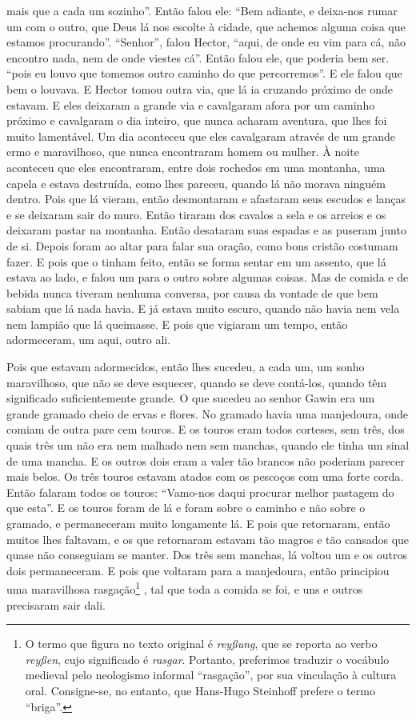 mais que a cada um sozinho”. Então falou ele: “Bem adiante, e deixa-nos rumar
um com o outro, que Deus lá nos escolte à cidade, que achemos alguma coisa que
estamos procurando”. “Senhor”, falou Hector, “aqui, de onde eu vim para cá, não
encontro nada, nem de onde viestes cá”. Então falou ele, que poderia bem ser.
“pois eu louvo que tomemos outro caminho do que percorremos”. E ele falou que
bem o louvava. E Hector tomou outra via, que lá ia cruzando próximo de onde
estavam. E eles deixaram a grande via e cavalgaram afora por um caminho próximo
e cavalgaram o dia inteiro, que nunca acharam aventura, que lhes foi muito
lamentável. Um dia aconteceu que eles cavalgaram através de um grande ermo e
maravilhoso, que nunca encontraram homem ou mulher. À noite aconteceu que eles
encontraram, entre dois rochedos em uma montanha, uma capela e estava
destruída, como lhes pareceu, quando lá não morava ninguém dentro. Pois que lá
vieram, então desmontaram e afastaram seus escudos e lanças e se deixaram sair
do muro. Então tiraram dos cavalos a sela e os arreios e os deixaram pastar na
montanha. Então desataram suas espadas e as puseram junto de si. Depois foram
ao altar para falar sua oração, como bons cristão costumam fazer. E
pois que o tinham feito, então se forma sentar em um assento, que lá estava ao
lado, e falou um para o outro sobre algumas coisas. Mas de comida e de bebida
nunca tiveram nenhuma conversa, por causa da vontade de que bem sabiam que lá
nada havia. E já estava muito escuro, quando não havia nem vela nem lampião que
lá queimasse. E pois que vigiaram um tempo, então adormeceram, um aqui, outro
ali.

Pois que estavam adormecidos, então lhes sucedeu, a cada um, um sonho
maravilhoso, que não se deve esquecer, quando se deve contá-los, quando têm
significado suficientemente grande. O que sucedeu ao senhor Gawin era um grande
gramado cheio de ervas e flores. No gramado havia uma manjedoura, onde comiam
de outra pare cem touros. E os touros eram todos corteses, sem três, dos quais
três um não era nem malhado nem sem manchas, quando ele tinha um sinal de uma
mancha. E os outros dois eram a valer tão brancos não poderiam parecer mais
belos. Os três touros estavam atados com os pescoços com uma forte corda. Então
falaram todos os touros: “Vamo-nos daqui procurar melhor pastagem do que esta”.
E os touros foram de lá e foram sobre o caminho e não sobre o gramado, e
permaneceram muito longamente lá. E pois que retornaram, então muitos lhes
faltavam, e os que retornaram estavam tão magros e tão cansados que quase não
conseguiam se manter. Dos três sem manchas, lá voltou um e os outros dois
permaneceram. E pois que voltaram para a manjedoura, então principiou uma
maravilhosa rasgação\footnote{ O termo que figura no texto original é
\textit{reyßung}, que se reporta ao verbo\textit{ reyßen},  cujo significado 
é \textit{rasgar}. Portanto,
preferimos traduzir o vocábulo medieval pelo neologismo informal “rasgação”,
por sua vinculação à cultura oral. Consigne-se, no entanto, que Hans-Hugo
Steinhoff prefere o termo “briga”.} ,  tal que
toda a comida se foi, e uns e outros precisaram sair dali. 

